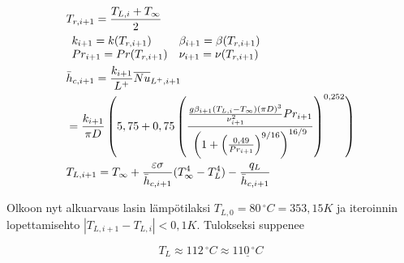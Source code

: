 \documentclass[12pt,a4paper,finnish]{article}
\begin{document}
\begin{align}
 &T_{r,i + 1} = \frac{T_{L,i} + T_{\infty}}{2}\\
 &\begin{array}{l l l l}
  k_{i+1} = k(T_{r,i + 1}) & \beta_{i+1} = \beta(T_{r,i + 1}) \\
    Pr_{i+1} = Pr(T_{r,i + 1}) & \nu_{i+1} = \nu(T_{r,i + 1})
  \end{array}\\
 &\bar{h}_{c, i+1} = \frac{k_{i+1}}{L^+}\overline{Nu}_{L^+,i+1} \\
 &= \frac{k_{i+1}}{\pi D}\left(5,75 + 
  0,75\left(\frac{\frac{g\beta_{i+1}(T_{L, i} - T_{\infty})(\pi D)^3}{\nu_{i+1}^2}Pr_{i+1}}
    {\left(1 + \left(\frac{0,49}{Pr_{i+1}}\right)^{9/16}\right)^{16/9}}\right)^{0,252}\right)\\
 &T_{L, i+1} =  T_{\infty} + \frac{\varepsilon\sigma}{\bar{h}_{c, i+1}}(T_{\infty}^4 - T_L^4) 
  - \frac{q_L}{\bar{h}_{c, i+1}}
\end{align}

Olkoon nyt alkuarvaus lasin lämpötilaksi $T_{L, 0} = 80\,^{\circ}C = 353,15 K$ ja iteroinnin lopettamisehto 
$|T_{L, i + 1} - T_{L, i}| < 0,1 K$. Tulokseksi suppenee

\begin{equation}
 T_L \approx 112\,^{\circ}C \approx \underline{110\,^{\circ}C}
\end{equation}
\end{document}
